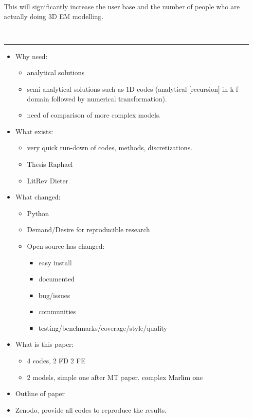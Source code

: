 \documentclass[
    paper,
  ]{geophysics}
\begin{document}
This will significantly increase the user base and the number of people who are
actually doing 3D EM modelling.

~\\ \hrule

\begin{itemize}
  \item Why need:
    \begin{itemize}
      \item analytical solutions
      \item semi-analytical solutions such as 1D codes (analytical [recursion]
        in k-f domain followed by numerical transformation).
      \item need of comparison of more complex models.
    \end{itemize}
  \item What exists:
    \begin{itemize}
      \item very quick run-down of codes, methods, discretizations.
      \item Thesis Raphael
      \item LitRev Dieter
    \end{itemize}
  \item What changed:
    \begin{itemize}
      \item Python
      \item Demand/Desire for reproducible research
      \item Open-source has changed:
        \begin{itemize}
          \item easy install
          \item documented
          \item bug/issues
          \item communities
          \item testing/benchmarks/coverage/style/quality
        \end{itemize}
    \end{itemize}
  \item What is this paper:
    \begin{itemize}
      \item 4 codes, 2 FD 2 FE
      \item 2 models, simple one after MT paper, complex Marlim one
    \end{itemize}
  \item Outline of paper
  \item Zenodo, provide all codes to reproduce the results.
\end{itemize}
\end{document}
